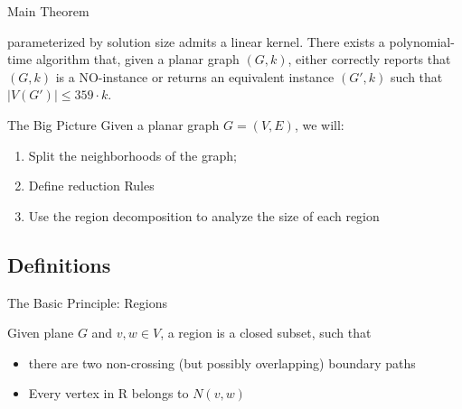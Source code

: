\begin{frame}[c]{Main Theorem}
\begin{tcolorbox}[colback=TUMBlueLighter,title=The Main Theorem]
    \psdom parameterized by solution size admits a linear kernel.
    There exists a polynomial-time algorithm that, given a planar graph $(G, k)$, either correctly reports that $(G, k)$ is a NO-instance or returns an equivalent instance $(G', k)$ such that $|V(G')| \leq 359 \cdot k$.
\end{tcolorbox}
\end{frame}

\begin{frame}[c]{The Big Picture}
    Given a planar graph $G = (V ,E)$, we will:

    \begin{enumerate}
     \pause   \item Split the neighborhoods of the graph;
     \pause   \item Define reduction Rules
     \pause   \item Use the region decomposition to analyze the size of each region
    \end{enumerate}
\end{frame}

\subsection{Definitions}
\begin{frame}[c]{The Basic Principle: Regions}

    \begin{tcolorbox}[colback=TUMBlueLighter,title=Region (Simplified)]
        Given plane $G$ and $v,w \in V$, a region is a closed subset, such that
        \begin{itemize}
            \item there are two non-crossing (but possibly overlapping) boundary paths
            \item Every vertex in R belongs to $N(v,w)$
        \end{itemize}
    \end{tcolorbox}
    \pause \begin{figure}[!ht]
        \end{figure}
\end{frame}

